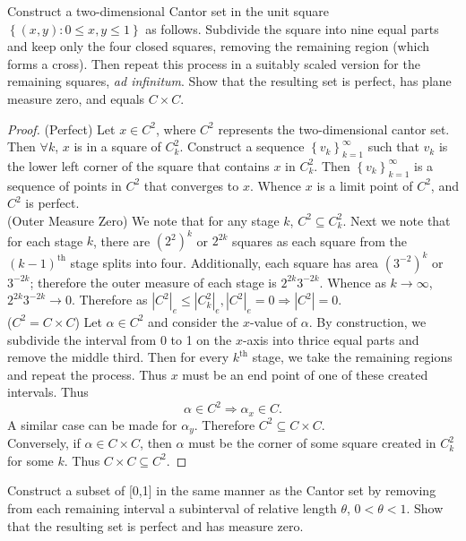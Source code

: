 \documentclass[12pt]{book}
\newcommand{\set}[1]{\left\{ #1 \right\}}
\renewcommand{\ss}{\subseteq}
\newcommand{\cross}{\times}
\renewcommand{\implies}{\Rightarrow}
\renewcommand{\.}{\mkern1mu}
\newcounter{case}
\newcommand{\abs}[1]{\left| #1 \right|}
\newcommand{\seq}[2]{\set{#1_{#2}}_{#2=1}^{\infty}}
\theoremstyle{theorem}
\begin{document}
\item Construct a two-dimensional Cantor set in the unit square $\set{(x,y): 0\leq x,y \leq 1}$ as follows. Subdivide the square into nine equal parts and keep only the four closed squares, removing the remaining region (which forms a cross). Then repeat this process in a suitably scaled version for the remaining squares, \textit{ad infinitum}. Show that the resulting set is perfect, has plane measure zero, and equals $C\cross C$.
	\begin{proof}
	(Perfect) Let $x\in C^2$, where $C^2$ represents the two-dimensional cantor set. Then $\forall k$, $x$ is in a square of $C_k^2$. Construct a sequence $\seq{v}{k}$ such that $v_k$ is the lower left corner of the square that contains $x$ in $C_k^2$. Then $\seq{v}{k}$ is a sequence of points in $C^2$ that converges to $x$. Whence $x$ is a limit point of $C^2$, and $C^2$ is perfect.\\
	
	(Outer Measure Zero) We note that for any stage $k$, $C^2\ss C_k^2$. Next we note that for each stage $k$, there are $(2^2)^k$ or $2^{2k}$ squares as each square from the $(k-1)^{\text{th}}$ stage splits into four. Additionally, each square has area $(3^{-2})^k$ or $3^{-2k}$; therefore the outer measure of each stage is $2^{2k}3^{-2k}$. Whence as $k\to \infty$, $2^{2k}3^{-2k} \to 0$. Therefore as $\abs{C^2}_e \leq \abs{C_k^2}_e, \abs{C^2}_e = 0 \implies \abs{C^2} = 0$.\\
	
	($C^2 = C\cross C$) Let $\alpha \in C^2$ and consider the $x$-value of $\alpha$. By construction, we subdivide the interval from 0 to 1 on the $x$-axis into thrice equal parts and remove the middle third. Then for every $k^\text{th}$ stage, we take the remaining regions and repeat the process. Thus $x$ must be an end point of one of these created intervals. Thus
	\[ \alpha\in C^2 \implies \alpha_x \in C. \]
A similar case can be made for $\alpha_y$. Therefore $C^2 \ss C\cross C$.\\

Conversely, if $\alpha \in C\cross C$, then $\alpha$ must be the corner of some square created in $C_k^2$ for some $k$. Thus $C\cross C \ss C^2$.
	\end{proof}
\item Construct a subset of [0,1] in the same manner as the Cantor set by removing from each remaining interval a subinterval of relative length $\theta$, $0<\theta<1$. Show that the resulting set is perfect and has measure zero.
\end{document}
